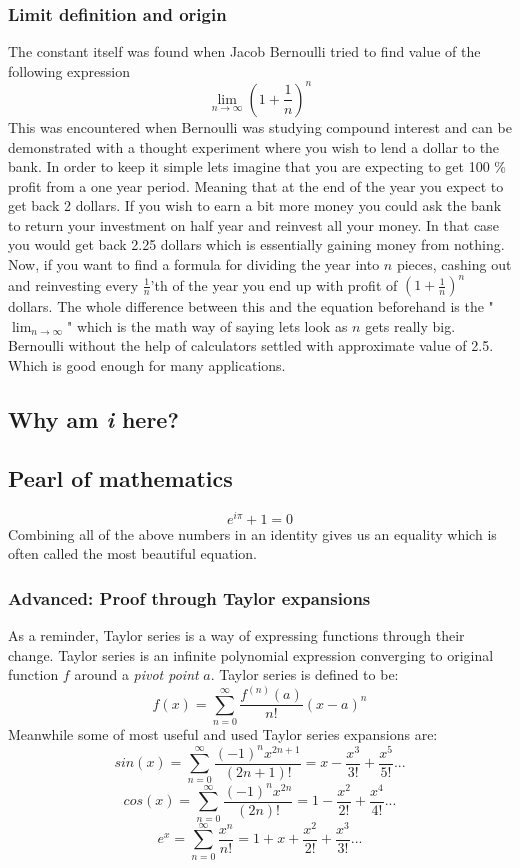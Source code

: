 \documentclass[pdftex, 12pt, a4paper]{report}
\begin{document}
	\subsubsection{Limit definition and origin}
	The constant itself was found when Jacob Bernoulli tried to find value of the following expression $$\lim_{n\rightarrow\infty} (1 + \frac{1}{n})^n$$
	This was encountered when Bernoulli was studying compound interest and can be demonstrated with a thought experiment where you wish to lend a dollar to the bank. In order to keep it simple lets imagine that you are expecting to get 100 \% profit from a one year period. Meaning that at the end of the year you expect to get back 2 dollars. If you wish to earn a bit more money you could ask the bank to return your investment on half year and reinvest all your money. In that case you would get back 2.25 dollars which is essentially gaining money from nothing. Now, if you want to find a formula for dividing the year into $n$ pieces, cashing out and reinvesting every $\frac{1}{n}$'th of the year you end up with profit of $(1 + \frac{1}{n})^n$ dollars. The whole difference between this and the equation beforehand is the "$\lim_{n\rightarrow\infty}$" which is the math way of saying lets look as $n$ gets really big. Bernoulli without the help of calculators settled with approximate value of 2.5. Which is good enough for many applications.
	\subsection{Why am \textit{i} here?}
	
	\subsection{Pearl of mathematics}
	$$e^{i\pi} + 1 = 0$$
	Combining all of the above numbers in an identity gives us an equality which is often called the most beautiful equation.
	\subsubsection{Advanced: Proof through Taylor expansions}
	As a reminder, Taylor series is a way of expressing functions through their change. Taylor series is an infinite polynomial expression converging to original function $f$ around a \textit{pivot point} $a$. Taylor series is defined to be:
		$$f(x) = \sum_{n=0}^{\infty} \frac{f^{(n)}(a)}{n!}(x - a)^n$$
	Meanwhile some of most useful and used Taylor series expansions are:
		$$sin(x) = \sum_{n=0}^{\infty} \frac{(-1)^nx^{2n+1}}{(2n+1)!} = x - \frac{x^3}{3!} + \frac{x^5}{5!}...$$
		$$cos(x) = \sum_{n=0}^{\infty} \frac{(-1)^nx^{2n}}{(2n)!} = 1 - \frac{x^2}{2!} + \frac{x^4}{4!}...$$
		$$e^x = \sum_{n=0}^{\infty} \frac{x^n}{n!} = 1 + x + \frac{x^2}{2!} + \frac{x^3}{3!}...$$
		
\end{document}
